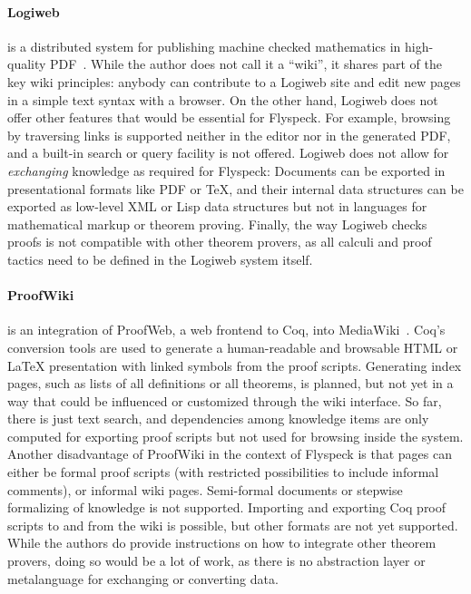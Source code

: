 \paragraph{Logiweb} is a distributed system for publishing machine checked mathematics in
high-quality PDF~\cite{Grue:Logiweb07}.  While the author does not call
it a ``wiki'', it shares part of the key wiki principles: anybody can
contribute to a Logiweb site and edit new pages in a simple text
syntax with a browser.  On the other hand, Logiweb does not offer
other features that would be essential for Flyspeck.  For example,
browsing by traversing links is supported neither in the editor nor in
the generated PDF, and a built-in search or query facility is not
offered.  Logiweb does not allow for \emph{exchanging} knowledge as
required for Flyspeck: Documents can be exported in presentational
formats like PDF or \TeX{}, and their internal data structures can be
exported as low-level XML or Lisp data structures but not in languages
for mathematical markup or theorem proving.  Finally, the way Logiweb
checks proofs is not compatible with other theorem provers, as all
calculi and proof tactics need to be defined in the Logiweb system
itself.

\paragraph{ProofWiki} is an integration of ProofWeb, a web frontend to Coq, into
MediaWiki~\cite{CorKal:CoopReposFormalProofs07}.  Coq's conversion
tools are used to generate a human-readable and browsable HTML or
{\LaTeX} presentation with linked symbols from the proof scripts.
Generating index pages, such as lists of all definitions or all
theorems, is planned, but not yet in a way that could be influenced or
customized through the wiki interface.  So far, there is just text
search, and dependencies among knowledge items are only computed for
exporting proof scripts but not used for browsing inside the system.
Another disadvantage of ProofWiki in the context of Flyspeck is that
pages can either be formal proof scripts (with restricted
possibilities to include informal comments), or informal wiki pages.
Semi-formal documents or stepwise formalizing of knowledge is not
supported.  Importing and exporting Coq proof scripts to and from the
wiki is possible, but other formats are not yet supported.  While the
authors do provide instructions on how to integrate other theorem
provers, doing so would be a lot of work, as there is no abstraction
layer or metalanguage for exchanging or converting data.

